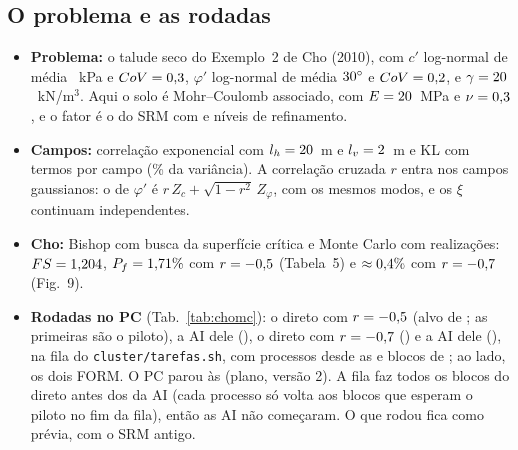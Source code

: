 \documentclass[11pt,a4paper]{article}
\begin{document}
\subsection{O problema e as rodadas}
\begin{itemize}
\item \textbf{Problema:} o talude seco do Exemplo~2 de Cho (2010), com $c'$ log-normal de média \ChoC~kPa e
$CoV = 0{,}3$, $\varphi'$ log-normal de média $30^\circ$ e $CoV = 0{,}2$, e $\gamma = 20$~kN/m$^3$.
Aqui o solo é Mohr--Coulomb associado, com $E = 20$~MPa e $\nu = 0{,}3$, e o fator é o do SRM com \texttt{\ChoMalha} e
\ChoNref{} níveis de refinamento.
\item \textbf{Campos:} correlação exponencial com $l_h = 20$~m e $l_v = 2$~m e KL com \ChoKLM{} termos por campo
(\ChoKLvar\% da variância). A correlação cruzada $r$ entra nos campos gaussianos: o de $\varphi'$ é
$r\,Z_c + \sqrt{1 - r^2}\,Z_\varphi$, com os mesmos modos, e os $\xi$ continuam independentes.
\item \textbf{Cho:} Bishop com busca da superfície crítica e Monte Carlo com \ChoNmc{} realizações: $FS = 1{,}204$,
$P_f = 1{,}71\%$ com $r = -0{,}5$ (Tabela~5) e $\approx0{,}4\%$ com $r = -0{,}7$ (Fig.~9).
\item \textbf{Rodadas no PC} (Tab.~\ref{tab:chomc}): o direto com $r = -0{,}5$ (alvo de \ChoCincoAlvo; as
\ChoPilotoN{} primeiras são o piloto), a AI dele (\ChoAICincoAlvo), o direto com $r = -0{,}7$ (\ChoSeteAlvo) e a AI
dele (\ChoAISeteAlvo), na fila do \texttt{cluster/tarefas.sh}, com \ChoProcessos{} processos desde as \ChoInicio{} e
blocos de \ChoBloco; ao lado, os dois FORM. \ifpcparou O PC parou às \PcParou{} (plano, versão 2). A fila faz todos os
blocos do direto antes dos da AI (cada processo só volta aos blocos que esperam o piloto no fim da fila), então as AI não
começaram. O que rodou fica como prévia, com o SRM antigo.\fi
\end{itemize}
\end{document}
